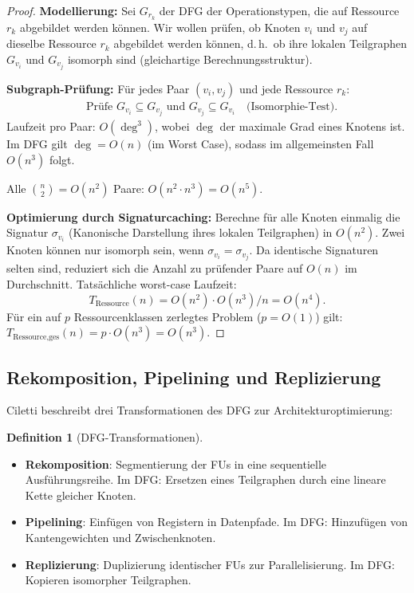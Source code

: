 ﻿\documentclass[a4paper,12pt]{article}
\theoremstyle{definition}
\newtheorem{definition}{Definition}
\begin{document}
\begin{proof}
  \textbf{Modellierung:} Sei $G_{r_k}$ der DFG der Operationstypen, die auf Ressource
  $r_k$ abgebildet werden können. Wir wollen prüfen, ob Knoten $v_i$ und $v_j$ auf
  dieselbe Ressource $r_k$ abgebildet werden können, d.\,h.\ ob ihre lokalen
  Teilgraphen $G_{v_i}$ und $G_{v_j}$ isomorph sind (gleichartige Berechnungsstruktur).

  \textbf{Subgraph-Prüfung:} Für jedes Paar $(v_i, v_j)$ und jede Ressource $r_k$:
  \begin{align*}
    &\text{Prüfe } G_{v_i} \subseteq G_{v_j} \text{ und } G_{v_j} \subseteq G_{v_i}
    \quad \text{(Isomorphie-Test)}.
  \end{align*}
  Laufzeit pro Paar: $O(\deg^3)$, wobei $\deg$ der maximale Grad eines Knotens ist.
  Im DFG gilt $\deg = O(n)$ (im Worst Case), sodass im allgemeinsten Fall $O(n^3)$ folgt.

  Alle $\binom{n}{2} = O(n^2)$ Paare: $O(n^2 \cdot n^3) = O(n^5)$.

  \textbf{Optimierung durch Signaturcaching:} Berechne für alle Knoten einmalig die
  Signatur $\sigma_{v_i}$ (Kanonische Darstellung ihres lokalen Teilgraphen) in $O(n^2)$.
  Zwei Knoten können nur isomorph sein, wenn $\sigma_{v_i} = \sigma_{v_j}$. Da
  identische Signaturen selten sind, reduziert sich die Anzahl zu prüfender Paare
  auf $O(n)$ im Durchschnitt. Tatsächliche worst-case Laufzeit:
  \[
    T_{\text{Ressource}}(n) = O(n^2) \cdot O(n^3) / n = O(n^4).
  \]
  Für ein auf $p$ Ressourcenklassen zerlegtes Problem ($p = O(1)$) gilt:
  $T_{\text{Ressource,ges}}(n) = p \cdot O(n^3) = O(n^3)$.
\end{proof}

\subsection{Rekomposition, Pipelining und Replizierung}

Ciletti \cite[S.~576]{ciletti2011} beschreibt drei Transformationen des DFG zur
Architekturoptimierung:

\begin{definition}[DFG-Transformationen]
  \begin{itemize}
    \item \textbf{Rekomposition}: Segmentierung der FUs in eine sequentielle Ausführungsreihe.
          Im DFG: Ersetzen eines Teilgraphen durch eine lineare Kette gleicher Knoten.
    \item \textbf{Pipelining}: Einfügen von Registern in Datenpfade. Im DFG: Hinzufügen
          von Kantengewichten und Zwischenknoten.
    \item \textbf{Replizierung}: Duplizierung identischer FUs zur Parallelisierung.
          Im DFG: Kopieren isomorpher Teilgraphen.
  \end{itemize}
\end{definition}
\end{document}
